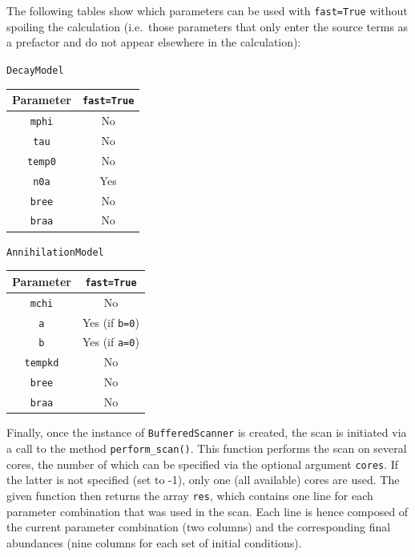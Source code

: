 \documentclass[11pt,a4paper]{article}
\begin{document}
The following tables show which parameters can be used with \texttt{fast=True} without spoiling the calculation (i.e.\ those parameters that only enter the source terms as a prefactor and do not appear elsewhere in the calculation):
\begin{center}
\begin{minipage}{0.495\textwidth}
\centering
\texttt{DecayModel}\\
\begin{tabular}{|c|c|}
	\hline
	Parameter & \texttt{fast=True} \\
	\hline
	\texttt{mphi} & No \\
	\hline
	\texttt{tau} & No \\
	\hline
	\texttt{temp0} & No \\
	\hline
	\texttt{n0a} & Yes \\
	\hline
	\texttt{bree} & No \\
	\hline
	\texttt{braa} & No \\
	\hline
\end{tabular}
\end{minipage}
\begin{minipage}{0.495\textwidth}
\centering
\texttt{AnnihilationModel}\vspace{2.5pt}\\
\begin{tabular}{|c|c|}
	\hline
	Parameter & \texttt{fast=True} \\
	\hline
	\texttt{mchi} & No \\
	\hline
	\texttt{a} & Yes (if \texttt{b=0})  \\
	\hline
	\texttt{b} & Yes (if \texttt{a=0}) \\
	\hline
	\texttt{tempkd} & No \\
	\hline
	\texttt{bree} & No \\
	\hline
	\texttt{braa} & No \\
	\hline
\end{tabular}
\end{minipage}
\end{center}
\vspace{4mm}

Finally, once the instance of \texttt{BufferedScanner} is created, the scan is initiated via a call to the method \texttt{perform\_scan()}. This function performs the scan on several cores, the number of which can be specified via the optional argument \texttt{cores}. If the latter is not specified (set to -1), only one (all available) cores are used. The given function then returns the array \texttt{res}, which contains one line for each parameter combination that was used in the scan. Each line is hence composed of the current parameter combination (two columns) and the corresponding final abundances (nine columns for each set of initial conditions).
\end{document}
